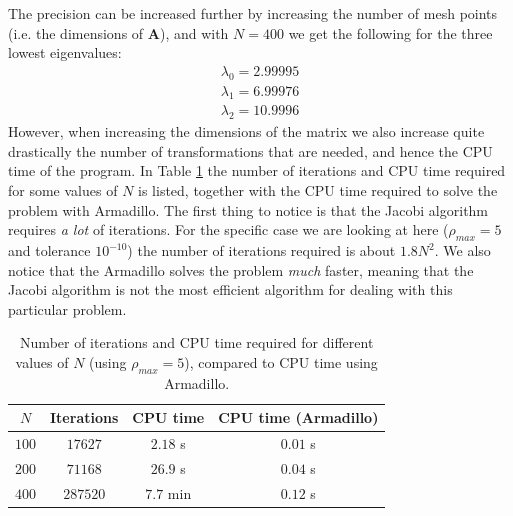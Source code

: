 \documentclass[12pt, a4paper]{article}
\begin{document}
The precision can be increased further by increasing the number of mesh points (i.e. the dimensions 
of $\mathbf{A}$), and with $N = 400$ we get the following for the three lowest eigenvalues: 
\begin{align*}
\lambda_0 = 2.99995 \\
\lambda_1 = 6.99976 \\
\lambda_2 = 10.9996 
\end{align*}
However, when increasing the dimensions of the matrix we also increase quite drastically the number of 
transformations that are needed, and hence the CPU time of the program. In Table \ref{tab:It_and_CPU} 
the number of iterations and CPU time required for some values of $N$ is listed, together with the 
CPU time required to solve the problem with Armadillo. The first thing to notice is that the Jacobi 
algorithm requires \textit{a lot} of iterations. For the specific case we are looking at here 
($\rho_{max} = 5$ and tolerance $10^{-10}$) the number of iterations required is about $1.8N^2$. 
We also notice that the Armadillo solves the problem \textit{much} faster, meaning that the Jacobi 
algorithm is not the most efficient algorithm for dealing with this particular problem.   

\begin{table}
\begin{center}
\caption{Number of iterations and CPU time required for different values of $N$ (using $\rho_{max} = 5$),
compared to CPU time using Armadillo.}
\label{tab:It_and_CPU}
\begin{tabular}{cccc} \hline \hline 
$N$ & Iterations & CPU time & CPU time (Armadillo) \\ \hline 
$100$ & $17627$  & $2.18$ s  & $0.01$ s \\
$200$ & $71168$  & $26.9$ s  & $0.04$ s \\
$400$ & $287520$ & $7.7$ min & $0.12$ s \\ \hline \hline
\end{tabular}
\end{center}
\end{table}
\end{document}
